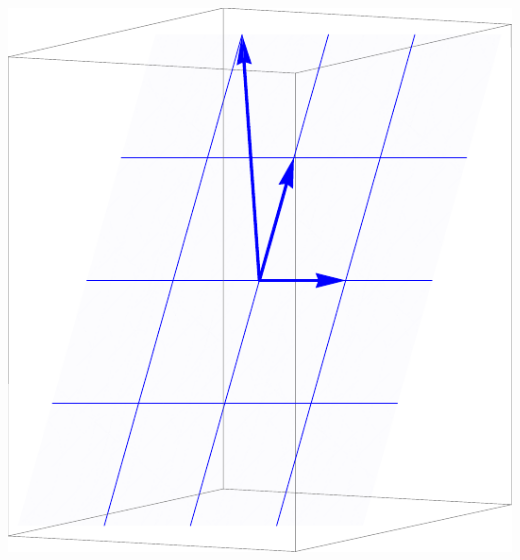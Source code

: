 \begin{example}
{\includegraphics[width=\marginparwidth]{Applications/support/colspace1}

}
\end{example}
